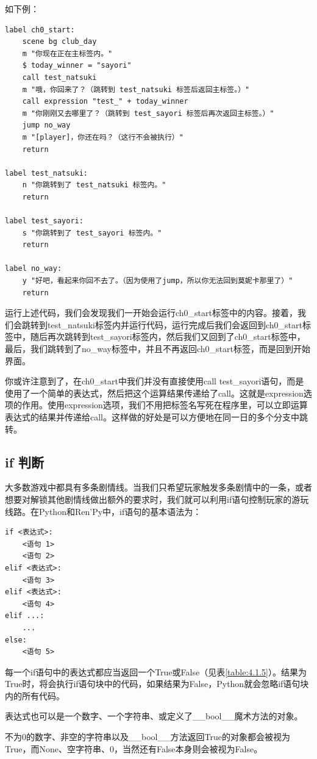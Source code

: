 \documentclass[../../Main.tex]{subfiles}
\begin{document}
如下例：
\begin{lstlisting}
label ch0_start:
    scene bg club_day
    m "你现在正在主标签内。"
    $ today_winner = "sayori"
    call test_natsuki
    m "哦，你回来了？（跳转到 test_natsuki 标签后返回主标签。）"
    call expression "test_" + today_winner
    m "你刚刚又去哪里了？（跳转到 test_sayori 标签后再次返回主标签。）"
    jump no_way
    m "[player]，你还在吗？（这行不会被执行）"
    return

label test_natsuki:
    n "你跳转到了 test_natsuki 标签内。"
    return

label test_sayori:
    s "你跳转到了 test_sayori 标签内。"
    return

label no_way:
    y "好吧，看起来你回不去了。（因为使用了jump，所以你无法回到莫妮卡那里了）"
    return
\end{lstlisting}

运行上述代码，我们会发现我们一开始会运行ch0\_start标签中的内容。接着，我们会跳转到test\_natsuki标签内并运行代码，运行完成后我们会返回到ch0\_start标签中，随后再次跳转到test\_sayori标签内，然后我们又回到了ch0\_start标签中，最后，我们跳转到了no\_way标签中，并且不再返回ch0\_start标签，而是回到开始界面。

你或许注意到了，在ch0\_start中我们并没有直接使用call test\_sayori语句，而是使用了一个简单的表达式，然后把这个运算结果传递给了call。这就是expression选项的作用。使用expression选项，我们不用把标签名写死在程序里，可以立即运算表达式的结果并传递给call。这样做的好处是可以方便地在同一日的多个分支中跳转。

\subsection{if 判断}
大多数游戏中都具有多条剧情线。当我们只希望玩家触发多条剧情中的一条，或者想要对解锁其他剧情线做出额外的要求时，我们就可以利用if语句控制玩家的游玩线路。在Python和Ren'Py中，if语句的基本语法为：
\begin{lstlisting}
if <表达式>:
    <语句 1>
    <语句 2>
elif <表达式>:
    <语句 3>
elif <表达式>:
    <语句 4>
elif ...:
    ...
else:
    <语句 5>
\end{lstlisting}

每一个if语句中的表达式都应当返回一个True或False（见表\ref{table:4.1.5}）。结果为True时，将会执行if语句块中的代码，如果结果为False，Python就会忽略if语句块内的所有代码。

\begin{ExtraKnowledge}
    
    表达式也可以是一个数字、一个字符串、或定义了\_\_bool\_\_魔术方法的对象。

    不为0的数字、非空的字符串以及\_\_bool\_\_方法返回True的对象都会被视为True，而None、空字符串、0，当然还有False本身则会被视为False。
\end{ExtraKnowledge}
\end{document}
